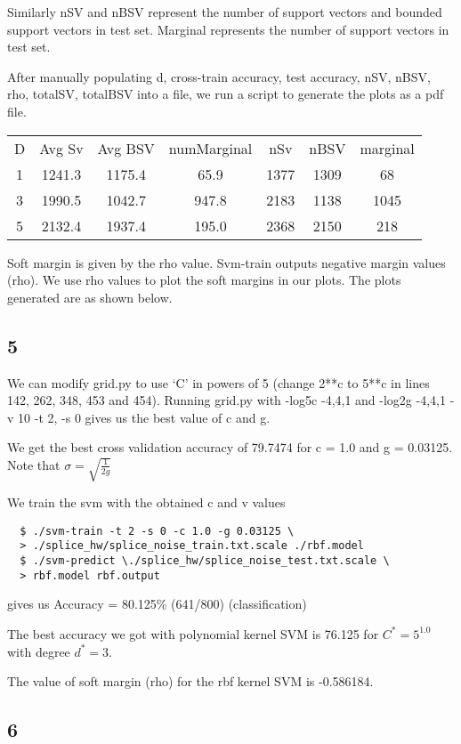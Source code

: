 \documentclass{article}
\begin{document}
Similarly nSV and nBSV represent the number of support vectors and bounded support vectors in test set.  Marginal represents the number of support vectors in test set.

After manually populating d, cross-train accuracy, test accuracy, nSV, nBSV, rho, totalSV, totalBSV into a file\cite{ques4file}, we run a script\cite{ques4py} to generate the plots as a pdf file.

\begin{tabular}{*{7}{c}}
  D & Avg Sv & Avg BSV & numMarginal & nSv & nBSV & marginal \\
  1 & 1241.3 & 1175.4 & 65.9 & 1377 & 1309 & 68 \\
  3 & 1990.5 & 1042.7 & 947.8 & 2183 & 1138 & 1045 \\
  5 & 2132.4 & 1937.4 & 195.0 & 2368 & 2150 & 218 \\
\end{tabular}

Soft margin is given by the rho value.  Svm-train outputs negative margin values (rho). We use rho values to plot the soft margins in our plots.
The plots generated are as shown below.


\subsection*{5}
We can modify grid.py to use `C' in powers of 5 (change 2**c to 5**c in lines 142, 262, 348, 453 and 454).
Running grid.py with -log5c -4,4,1 and -log2g -4,4,1 -v 10 -t 2, -s 0 gives us the best value of c and g.

We get the best cross validation accuracy of 79.7474 for c = 1.0 and g = 0.03125.  Note that \( \sigma = \sqrt{\frac{1}{2g}} \)

We train the svm with the obtained c and v values
\begin{lstlisting}
  $ ./svm-train -t 2 -s 0 -c 1.0 -g 0.03125 \
  > ./splice_hw/splice_noise_train.txt.scale ./rbf.model
  $ ./svm-predict \./splice_hw/splice_noise_test.txt.scale \
  > rbf.model rbf.output
\end{lstlisting}
gives us Accuracy = 80.125\% (641/800) (classification)

The best accuracy we got with polynomial kernel SVM is 76.125 for \( C^{*} = 5^{1.0} \) with degree \( d^{*} = 3 \).

The value of soft margin (rho) for the rbf kernel SVM is -0.586184.

\subsection*{6}
\end{document}
